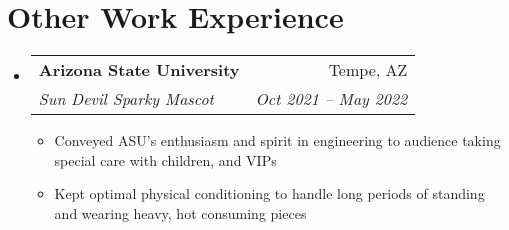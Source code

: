 \documentclass[letterpaper,11pt]{article}
\makeatletter
\newcommand{\resumeItem}[1]{
  \item\small{
    {#1 \vspace{-2pt}}
  }
}
\newcommand{\resumeSubheading}[4]{
  \vspace{-2pt}\item
    \begin{tabular*}{0.97\textwidth}[t]{l@{\extracolsep{\fill}}r}
      \textbf{#1} & #2 \\
      \textit{\small#3} & \textit{\small #4} \\
    \end{tabular*}\vspace{-7pt}
}
\newcommand{\resumeSubSubheading}[2]{
    \item
    \begin{tabular*}{0.97\textwidth}{l@{\extracolsep{\fill}}r}
      \textit{\small#1} & \textit{\small #2} \\
    \end{tabular*}\vspace{-7pt}
}
\newcommand{\resumeProjectHeading}[2]{
    \item
    \begin{tabular*}{0.97\textwidth}{l@{\extracolsep{\fill}}r}
      \small#1 & #2 \\
    \end{tabular*}\vspace{-7pt}
}
\newcommand{\resumeSubHeadingListStart}{\begin{itemize}[leftmargin=0.15in, label={}]}
\newcommand{\resumeSubHeadingListEnd}{\end{itemize}}
\newcommand{\resumeItemListStart}{\begin{itemize}}
\newcommand{\resumeItemListEnd}{\end{itemize}\vspace{-5pt}}
\makeatother
\begin{document}



\section{Other Work Experience}
\resumeSubHeadingListStart


\resumeSubheading
{Arizona State University}{Tempe, AZ}
{Sun Devil Sparky Mascot}{Oct 2021 -- May 2022}
\resumeItemListStart
\resumeItem{Conveyed ASU's enthusiasm and spirit in engineering to audience taking special care with children, and VIPs}
\resumeItem{Kept optimal physical conditioning to handle long periods of standing and wearing heavy, hot consuming pieces}
\resumeItemListEnd


\resumeSubHeadingListEnd
\end{document}
